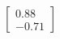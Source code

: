 \documentclass[preview]{standalone}
\begin{document}
\begin{align*}
\begin{bmatrix} 0.88 \\ -0.71 \end{bmatrix}
\end{align*}
\end{document}
